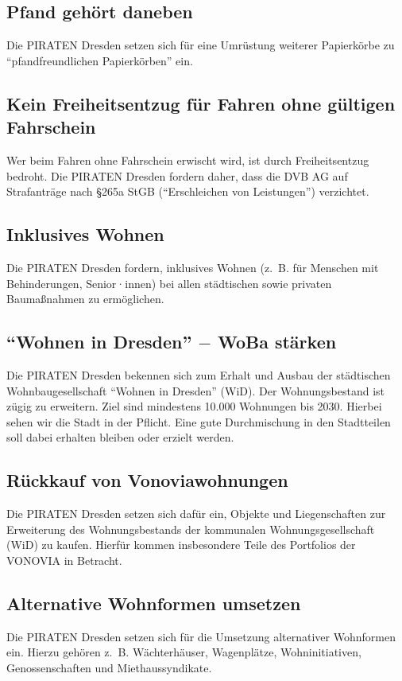 \documentclass[a4paper, 11pt]{article}
\begin{document}
\subsection{Pfand gehört daneben}
Die PIRATEN Dresden setzen sich für eine Umrüstung weiterer Papierkörbe zu ``pfandfreundlichen Papierkörben'' ein.


\subsection{Kein Freiheitsentzug für Fahren ohne gültigen Fahrschein}
Wer beim Fahren ohne Fahrschein erwischt wird, ist durch Freiheitsentzug bedroht. Die PIRATEN Dresden fordern daher, dass die DVB AG auf Strafanträge nach §265a StGB (``Erschleichen von Leistungen'') verzichtet.


\subsection{Inklusives Wohnen}
Die PIRATEN Dresden fordern, inklusives Wohnen (z. B. für Menschen mit Behinderungen, Senior·innen) bei allen städtischen sowie privaten Baumaßnahmen zu ermöglichen.


\subsection{``Wohnen in Dresden'' $-$ WoBa stärken}
Die PIRATEN Dresden bekennen sich zum Erhalt und Ausbau der städtischen Wohnbaugesellschaft ``Wohnen in Dresden'' (WiD). Der Wohnungsbestand ist zügig zu erweitern. Ziel sind mindestens 10.000 Wohnungen bis 2030. Hierbei sehen wir die Stadt in der Pflicht. Eine gute Durchmischung in den Stadtteilen soll dabei erhalten bleiben oder erzielt werden.


\subsection{Rückkauf von Vonoviawohnungen}
Die PIRATEN Dresden setzen sich dafür ein, Objekte und Liegenschaften zur Erweiterung des Wohnungsbestands der kommunalen Wohnungsgesellschaft (WiD) zu kaufen. Hierfür kommen insbesondere Teile des Portfolios der VONOVIA in Betracht.


\subsection{Alternative Wohnformen umsetzen}
Die PIRATEN Dresden setzen sich für die Umsetzung alternativer Wohnformen ein. Hierzu gehören z. B. Wächterhäuser, Wagenplätze, Wohninitiativen, Genossenschaften und Miethaussyndikate.
\end{document}
